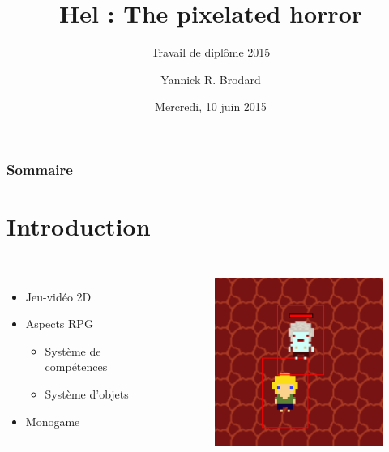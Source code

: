 \documentclass{beamer}
\title[Hel : The pixelated horror]{Hel : The pixelated horror}
\subtitle{Travail de diplôme 2015}
\author{Yannick R. Brodard}
\institute{Centre de Formation Professionnelle Technique\\École d'informatique}
\date{Mercredi, 10 juin 2015}
\begin{document}
\frame{\titlepage}

\begin{frame}
\frametitle{Sommaire}
\tableofcontents[hideallsubsections]
\end{frame}


\section{Introduction}
\subsection{}
\begin{frame}
\begin{columns}
	\begin{itemize}
		\item Jeu-vidéo 2D
		\item Aspects RPG
		\begin{itemize}
			\item Système de compétences
			\item Système d'objets
		\end{itemize}
		\item Monogame
	\end{itemize}
\begin{figure}
\includegraphics[width=1\textwidth]{img/hitbox.png}
\end{figure}
\end{columns}
\end{frame}
\end{document}
